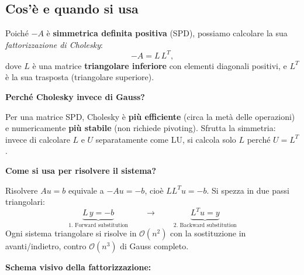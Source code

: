 \documentclass[a4paper,11pt]{article}
\theoremstyle{definition}
\begin{document}
\subsection{Cos'è e quando si usa}

Poiché $-A$ è \textbf{simmetrica definita positiva} (SPD), possiamo calcolare la sua
\emph{fattorizzazione di Cholesky}:
\[
  -A = L\,L^T,
\]
dove $L$ è una matrice \textbf{triangolare inferiore} con elementi diagonali positivi,
e $L^T$ è la sua trasposta (triangolare superiore).

\begin{tcolorbox}[concetto]
\textbf{Perché Cholesky invece di Gauss?}

Per una matrice SPD, Cholesky è \textbf{più efficiente} (circa la metà delle operazioni)
e numericamente \textbf{più stabile} (non richiede pivoting). Sfrutta la simmetria:
invece di calcolare $L$ e $U$ separatamente come LU, si calcola solo $L$ perché $U = L^T$.

\medskip
\textbf{Come si usa per risolvere il sistema?}

Risolvere $Au = b$ equivale a $-Au = -b$, cioè $LL^T u = -b$.
Si spezza in due passi triangolari:
\[
  \underbrace{L\,y = -b}_{\text{1. Forward substitution}}
  \qquad\longrightarrow\qquad
  \underbrace{L^T u = y}_{\text{2. Backward substitution}}
\]
Ogni sistema triangolare si risolve in $\mathcal{O}(n^2)$ con la sostituzione in avanti/indietro,
contro $\mathcal{O}(n^3)$ di Gauss completo.
\end{tcolorbox}

\bigskip
\noindent\textbf{Schema visivo della fattorizzazione:}

\begin{center}
\end{center}
\end{document}
